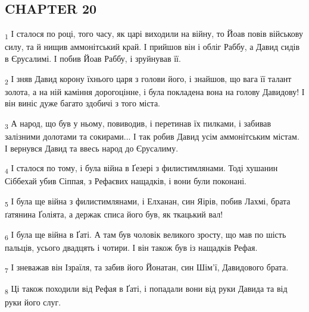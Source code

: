\subsection{CHAPTER 20}
\begin{tcolorbox}
\textsubscript{1} І сталося по році, того часу, як царі виходили на війну, то Йоав повів військову силу, та й нищив аммонітський край. І прийшов він і обліг Раббу, а Давид сидів в Єрусалимі. І побив Йоав Раббу, і зруйнував її.
\end{tcolorbox}
\begin{tcolorbox}
\textsubscript{2} І зняв Давид корону їхнього царя з голови його, і знайшов, що вага її талант золота, а на ній каміння дорогоцінне, і була покладена вона на голову Давидову! І він виніс дуже багато здобичі з того міста.
\end{tcolorbox}
\begin{tcolorbox}
\textsubscript{3} А народ, що був у ньому, повиводив, і перетинав їх пилками, і забивав залізними долотами та сокирами... І так робив Давид усім аммонітським містам. І вернувся Давид та ввесь народ до Єрусалиму.
\end{tcolorbox}
\begin{tcolorbox}
\textsubscript{4} І сталося по тому, і була війна в Ґезері з филистимлянами. Тоді хушанин Сіббехай убив Сіппая, з Рефаєвих нащадків, і вони були поконані.
\end{tcolorbox}
\begin{tcolorbox}
\textsubscript{5} І була ще війна з филистимлянами, і Елханан, син Яірів, побив Лахмі, брата ґатянина Ґоліята, а держак списа його був, як ткацький вал!
\end{tcolorbox}
\begin{tcolorbox}
\textsubscript{6} І була ще війна в Ґаті. А там був чоловік великого зросту, що мав по шість пальців, усього двадцять і чотири. І він також був із нащадків Рефая.
\end{tcolorbox}
\begin{tcolorbox}
\textsubscript{7} І зневажав він Ізраїля, та забив його Йонатан, син Шім'ї, Давидового брата.
\end{tcolorbox}
\begin{tcolorbox}
\textsubscript{8} Ці також походили від Рефая в Ґаті, і попадали вони від руки Давида та від руки його слуг.
\end{tcolorbox}
